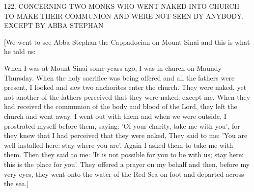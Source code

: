 122. CONCERNING TWO MONKS
WHO WENT NAKED INTO CHURCH
TO MAKE THEIR COMMUNION AND WERE NOT SEEN BY
ANYBODY, EXCEPT BY ABBA STEPHAN

[We went to sce Abba Stephan the Cappadocian on Mount Sinai
and this is what he told us:

When I was at Mount Sinai some years ago, I was in church on
Maundy Thursday. When the holy sacrifice was being offered and
all the fathers were present, I looked and saw two anchorites enter
the church. They were naked, yet not another of the fathers
perceived that they were naked, except me. When they had received
the communion of the body and blood of the Lord, they left the
church and went away. I went out with them and when we were
outside, I prostrated myself before them, saying: 'Of your charity,
take me with you', for they knew that I had perceived that they
were naked, They said to me: 'You are well installed here: stay
where you are'. Again I asked them to take me with them. Then
they said to me: 'It is not possible for you to be with us; stay here:
this is the place for you'. They offered a prayer on my behalf and
then, before my very eyes, they went onto the water of the Red Sea
on foot and departed across the sea.]

